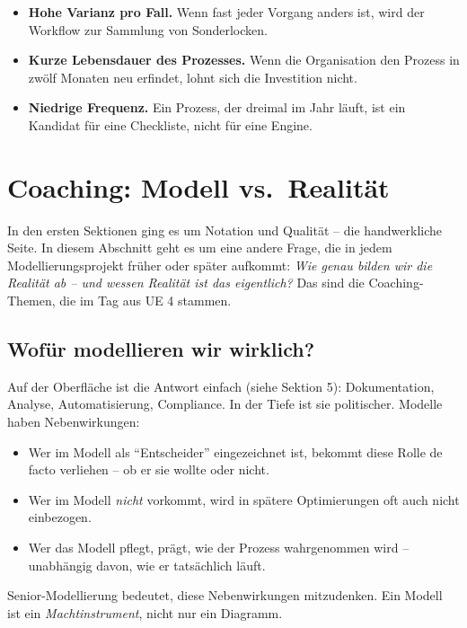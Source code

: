 \documentclass[11pt,a4paper,oneside]{article}
\begin{document}
\begin{itemize}
  \item \textbf{Hohe Varianz pro Fall.} Wenn fast jeder Vorgang anders ist, wird der Workflow zur Sammlung von Sonderlocken.
  \item \textbf{Kurze Lebensdauer des Prozesses.} Wenn die Organisation den Prozess in zwölf Monaten neu erfindet, lohnt sich die Investition nicht.
  \item \textbf{Niedrige Frequenz.} Ein Prozess, der dreimal im Jahr läuft, ist ein Kandidat für eine Checkliste, nicht für eine Engine.
\end{itemize}

\section{Coaching: Modell vs.\ Realität}

In den ersten Sektionen ging es um Notation und Qualität -- die handwerkliche Seite. In diesem Abschnitt geht es um eine andere Frage, die in jedem Modellierungsprojekt früher oder später aufkommt: \emph{Wie genau bilden wir die Realität ab -- und wessen Realität ist das eigentlich?} Das sind die Coaching-Themen, die im Tag aus UE 4 stammen.

\subsection{Wofür modellieren wir wirklich?}

Auf der Oberfläche ist die Antwort einfach (siehe Sektion 5): Dokumentation, Analyse, Automatisierung, Compliance. In der Tiefe ist sie politischer. Modelle haben Nebenwirkungen:

\begin{itemize}
  \item Wer im Modell als ``Entscheider'' eingezeichnet ist, bekommt diese Rolle de facto verliehen -- ob er sie wollte oder nicht.
  \item Wer im Modell \emph{nicht} vorkommt, wird in spätere Optimierungen oft auch nicht einbezogen.
  \item Wer das Modell pflegt, prägt, wie der Prozess wahrgenommen wird -- unabhängig davon, wie er tatsächlich läuft.
\end{itemize}

Senior-Modellierung bedeutet, diese Nebenwirkungen mitzudenken. Ein Modell ist ein \emph{Machtinstrument}, nicht nur ein Diagramm.
\end{document}
